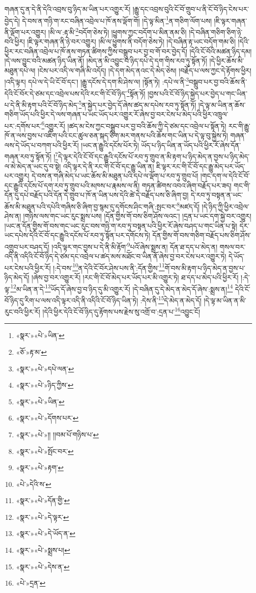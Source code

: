 གཞན་དུ་ན་དེ་ནི་དེའི་འབྲས་བུ་ཉིད་མ་ཡིན་པར་འགྱུར་རོ། །རྒྱུ་དང་འབྲས་བུའི་ངོ་བོ་གྲུབ་པ་ནི་ངོ་བོ་ཉིད་ངེས་པར་བྱེད་དེ། དེ་བས་ན་གཉི་ག་རང་བཞིན་འབྲེལ་པ་ཁོ་ནས་ལྡོག་གོ། །དེ་ལྟ་མིན་\footnote{«སྣར་»«པེ་»ཡིན་}ན་གཅིག་ལོག་པས། །ཇི་ལྟར་གཞན་ནི་ལྡོག་པར་འགྱུར། །མི་ལ་:རྟ་མི་\footnote{«ཅོ་»རྟ་མ་}བདོག་ཅེས་ཏེ། །ཕྱུགས་ཀྱང་བདོག་པ་མིན་ནམ་ཅི། །དེ་བཞིན་གཅིག་ཅིག་ཉེ་བའི་ཕྱིར། །ཇི་ལྟར་གཞན་ནི་ཉེ་བར་འགྱུར། །མི་ལ་ཕྱུགས་ནི་བདོག་ཅེས་ཏེ། །དེ་བཞིན་རྟ་ཡང་བདོག་གམ་ཅི། །དེའི་ཕྱིར་རང་བཞིན་འབྲེལ་པ་ཁོ་ནས་གཏན་ཚིགས་ཀྱིས་བསྒྲུབ་པར་བྱ་བ་གོ་བར་བྱེད་དོ། །དེའི་ངོ་བོའི་མཚན་ཉིད་དམ། །དེ་ལས་བྱུང་བའི་མཚན་ཉིད་ཡིན་ནོ། །མེད་ན་མི་འབྱུང་བ་ཉིད་དཔེ་དེ་དག་གིས་རབ་ཏུ་སྟོན་ཏོ། །དེ་ཕྱིར་ཆོས་མི་མཐུན་དཔེ་ལ། །ངེས་པར་འདི་ལ་གཞི་མི་འདོད། །དེ་དག་མེད་ནའང་དེ་མེད་ཅེས། །བརྗོད་པ་ལས་ཀྱང་དེ་རྟོགས་ཕྱིར། །འདི་ལྟར། དཔེ་ལ་དེ་ཡི་ངོ་བོ་དང་། །རྒྱུ་དངོས་དེ་དག་མི་ཤེས་ལ། །སྟོན་ཏེ། :དཔེ་ལ་ནི་\footnote{«སྣར་»«པེ་»དཔེ་ལན་}བསྒྲུབ་པར་བྱ་བའི་ཆོས་ནི་དེའི་ངོ་བོར་དེ་ཙམ་དང་འབྲེལ་པས་དེའི་རང་གི་ངོ་བོ་ཉིད་\footnote{«སྣར་»«པེ་»ཉིད་ཀྱིས་}སྟོན་ཏོ། །བྱས་པའི་ངོ་བོ་ཉིད་སྐྱེད་པར་བྱེད་པ་གང་ཡིན་པ་དེ་ནི་མི་རྟག་པའི་ངོ་བོ་ཉིད་མེད་\footnote{«སྣར་»«པེ་»ཡིན་}ན་སྐྱེད་པར་བྱེད་དོ་ཞེས་ཚད་མ་དཔེས་རབ་ཏུ་སྟོན་ཏོ། །དེ་ལྟ་མ་ཡིན་ན་ཆོས་གཅིག་ཡོད་པའི་ཕྱིར་དེ་ལས་གཞན་པ་ཡང་ཡོད་པར་འགྱུར་རོ་ཞེས་བྱ་བར་ངེས་པ་མེད་པའི་ཕྱིར་འཁྲུལ་པར་:དགོས་པར་\footnote{«སྣར་»«པེ་»དོགས་པར་}འགྱུར་རོ། །ཚད་མ་ངེས་ཀྱང་བསྒྲུབ་པར་བྱ་བའི་ཆོས་ཀྱི་དེ་ཙམ་དང་འབྲེལ་པ་སྟོན་ཏེ། རང་གི་རྒྱུ་ཁོ་ན་ལས་བྱས་པ་འཇིག་པའི་ངང་ཚུལ་ཅན་སྐད་ཅིག་མར་གནས་པའི་ཆོས་གང་ཡིན་པ་དེ་ལྟ་བུ་སྐྱེས་ཏེ། གཞན་ལས་དེ་ཡོད་པ་བཀག་པའི་ཕྱིར་རོ། །ཡང་ན་རྒྱུའི་དངོས་པོར་ཏེ། ཡོད་པ་ཉིད་ཡིན་ན་ཡོད་པའི་ཕྱིར་རོ་ཞེས་དོན་གཞན་རབ་ཏུ་སྟོན་ཏོ། །\footnote{«སྣར་»«པེ་»།། །།བམ་པོ་གཉིས་པ་}དེ་ལྟར་དེའི་ངོ་བོ་དང་རྒྱུའི་དངོས་པོ་རབ་ཏུ་གྲུབ་ན་མི་རྟག་པ་ཉིད་མེད་ན་བྱས་པ་ཉིད་མེད་ལ་མེ་མེད་ན་ཡང་དུ་བ་སྟེ། འདི་ལྟར་དེ་ནི་རང་གི་ངོ་བོ་དང་རྒྱུ་ཡིན་ན། ཇི་ལྟར་རང་གི་ངོ་བོ་དང་རྒྱུ་མེད་པར་ཡོད་པར་འགྱུར། དེ་བས་ན་གཞི་མེད་པ་ཡང་ཆོས་མི་མཐུན་པའི་དཔེ་ལ་ལྡོག་པ་རབ་ཏུ་གྲུབ་པོ། །གང་དག་ལ་དེའི་ངོ་བོ་དང་རྒྱུའི་དངོས་པོ་དག་རབ་ཏུ་གྲུབ་པའི་མཁས་པ་རྣམས་ལ་ནི། གཏན་ཚིགས་འབའ་ཞིག་བརྗོད་པར་ཟད། གང་གི་དོན་དུ་དཔེ་བརྗོད་པའི་དོན་དེ་གྲུབ་པ་ཁོ་ན་ཡིན་པས་དེའི་ཚེ་དེ་བརྗོད་པས་ཅི་ཞིག་བྱ། དེ་རབ་ཏུ་བསྟན་ན་ཡང་ཆོས་མི་མཐུན་པའི་དཔེའི་གཞིས་ཅི་ཞིག་བྱ་སྙམ་དུ་དགོངས་ཤིང་གཞི་:སྤང་བར་\footnote{«སྣར་»«པེ་»སྤོང་བར་}མཛད་དོ། །དེ་ཉིད་ཀྱི་ཕྱིར་འབྲེལ་ཤེས་ན། །གཉིས་ལས་གང་ཡང་རུང་སྨྲས་པས། །དོན་གྱིས་གོ་བས་ཅིག་ཤོས་ལའང་། །དྲན་པ་ཡང་དག་སྐྱེ་བར་འགྱུར། །ཡང་ན་དོན་གྱིས་གོ་བས་གང་ཡང་རུང་བས་གཉི་ག་རབ་ཏུ་བསྟན་པའི་ཕྱིར་རོ་ཞེས་བཤད་པ་གང་ཡིན་པ་སྟེ། དེར་ཡང་དཔེས་དེའི་ངོ་བོ་དང་རྒྱུའི་དངོས་པོ་རབ་ཏུ་སྟོན་པར་དགོངས་ཏེ། དོན་གྱིས་གོ་བས་གཅིག་བརྗོད་པས་ཅིག་ཤོས་འགྲུབ་པར་བཤད་དོ། །འདི་ལྟར་གང་བྱས་པ་དེ་ནི་མི་རྟོག་\footnote{«སྣར་»«པེ་»རྟག་}པའོ་ཞེས་སྨྲས་ན། དོན་ཐ་དད་པ་མེད་ན། གསལ་བར་འདི་ནི་འདིའི་ངོ་བོ་ཉིད་དེ་ཙམ་དང་འབྲེལ་པ་ཚད་མས་མཐོང་བ་ཡིན་ནོ་ཞེས་བྱ་བར་ངེས་པར་འགྱུར་ཏེ། དེ་ཡོད་པར་ངེས་པའི་ཕྱིར་རོ། །:དེ་བས་\footnote{«པེ་»དེའི་ས་}ན་དེའི་ངོ་བོར་ཤེས་པས་ནི་:དོན་གྱིས་\footnote{«སྣར་»«པེ་»དོན་གྱི་}གོ་བས་མི་རྟག་པ་ཉིད་མེད་ན་བྱས་པ་ཉིད་མེད་དོ། །ཞེས་བྱ་བར་འགྱུར་རོ། །རང་གི་ངོ་བོ་མེད་པར་ཡོད་པར་མི་འགྱུར་ཏེ། ཐ་དད་པ་མེད་པའི་ཕྱིར་རོ། །:དེ་ལྟ་\footnote{«སྣར་»«པེ་»དེ་ལྟར་}མ་ཡིན་ན་དེ་\footnote{«སྣར་»«པེ་»དེ་ཡོད་ན་}ཡོད་དོ་ཞེས་བྱ་བ་ཉིད་དུ་མི་འགྱུར་རོ། །དེ་བཞིན་དུ་དེ་མེད་ན་མེད་དོ་ཞེས་:སྨྲས་ན།\footnote{«སྣར་»«པེ་»སྨྲས་པ།} དེའི་ངོ་བོ་ཉིད་དུ་རིག་པ་ལས་འདི་ལྟར་འདི་ནི་འདིའི་ངོ་བོ་ཉིད་ཡིན་ཏེ། :དེས་ནི་\footnote{«སྣར་»«པེ་»དེས་ན་}དེ་མེད་ན་མེད་དོ། །དེ་ལྟ་མ་ཡིན་ན་མི་རུང་བའི་ཕྱིར་རོ། །དེའི་ཕྱིར་དེའི་ངོ་བོ་ཉིད་དུ་རྟོགས་པས་རྗེས་སུ་འགྲོ་བ་:དྲན་པ་\footnote{«པེ་»དྲན་}འབྱུང་ངོ། 